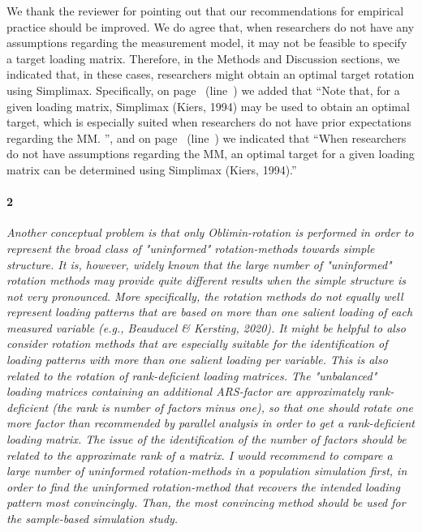 \documentclass[a4paper]{article}
\begin{document}
We thank the reviewer for pointing out that our recommendations for empirical practice should be improved. We do agree that, when researchers do not have any assumptions regarding the measurement model, it may not be feasible to specify a target loading matrix. Therefore, in the Methods and Discussion sections, we indicated that, in these cases, researchers might obtain an optimal target rotation using Simplimax. Specifically, on page~\pageref{refpage:R1Mj1b} (line~) we added that \textquotedblleft Note that, for a given loading matrix, Simplimax (Kiers, 1994) may be used to obtain an optimal target, which is especially suited when researchers do not have prior expectations regarding the MM. \textquotedblright, and on page~\pageref{refpage:R1Mj1a} (line~) we indicated that \textquotedblleft When researchers do not have assumptions regarding the MM, an optimal target for a given loading matrix can be determined using Simplimax (Kiers, 1994).\textquotedblright

\paragraph{2} \textit{Another conceptual problem is that only Oblimin-rotation is performed in order to represent the broad class of "uninformed" rotation-methods towards simple structure. It is, however, widely known that the large number of "uninformed" rotation methods may provide quite different results when the simple structure is not very pronounced. More specifically, the rotation methods do not equally well represent loading patterns that are based on more than one salient loading of each measured variable (e.g., Beauducel \& Kersting, 2020). It might be helpful to also consider rotation methods that are especially suitable for the identification of loading patterns with more than one salient loading per variable. This is also related to the rotation of rank-deficient loading matrices. The "unbalanced" loading matrices containing an additional ARS-factor are approximately rank-deficient (the rank is number of factors minus one), so that one should rotate one more factor than recommended by parallel analysis in order to get a rank-deficient loading matrix. The issue of the identification of the number of factors should be related to the approximate rank of a matrix. I would recommend to compare a large number of uninformed rotation-methods in a population simulation first, in order to find the uninformed rotation-method that recovers the intended loading pattern most convincingly. Than, the most convincing method should be used for the sample-based simulation study.}
\end{document}
